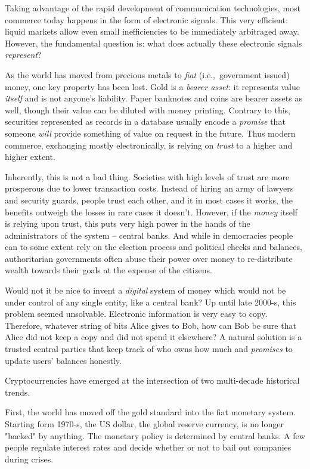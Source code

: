 Taking advantage of the rapid development of communication technologies, most commerce today happens in the form of electronic signals.
This very efficient: liquid markets allow even small inefficiencies to be immediately arbitraged away.
However, the fundamental question is: what does actually these electronic signals \textit{represent}?

As the world has moved from precious metals to \textit{fiat} (i.e.,~government issued) money, one key property has been lost.
Gold is a \textit{bearer asset}: it represents value \textit{itself} and is not anyone's liability.
Paper banknotes and coins are bearer assets as well, though their value can be diluted with money printing.
Contrary to this, securities represented as records in a database usually encode a \textit{promise} that someone \textit{will} provide something of value on request in the future.
Thus modern commerce, exchanging mostly electronically, is relying on \textit{trust} to a higher and higher extent.

Inherently, this is not a bad thing.
Societies with high levels of trust are more prosperous due to lower transaction costs.
Instead of hiring an army of lawyers and security guards, people trust each other, and it in most cases it works, the benefits outweigh the losses in rare cases it doesn't.
However, if the \textit{money} itself is relying upon trust, this puts very high power in the hands of the administrators of the system -- central banks.
And while in democracies people can to some extent rely on the election process and political checks and balances, authoritarian governments often abuse their power over money to re-distribute wealth towards their goals at the expense of the citizens.

Would not it be nice to invent a \textit{digital} system of money which would not be under control of any single entity, like a central bank?
Up until late 2000-s, this problem seemed unsolvable.
Electronic information is very easy to copy.
Therefore, whatever string of bits Alice gives to Bob, how can Bob be sure that Alice did not keep a copy and did not spend it elsewhere?
A natural solution is a trusted central parties that keep track of who owns how much and \textit{promises} to update users' balances honestly.

Cryptocurrencies have emerged at the intersection of two multi-decade historical trends.

First, the world has moved off the gold standard into the fiat monetary system.
Starting form 1970-s, the US dollar, the global reserve currency, is no longer "backed" by anything.
The monetary policy is determined by central banks.
A few people regulate interest rates and decide whether or not to bail out companies during crises.

